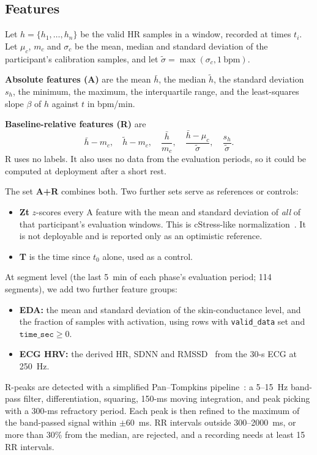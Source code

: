 \documentclass[conference]{IEEEtran}
\begin{document}
\subsection{Features}
Let $h=\{h_1,\dots,h_n\}$ be the valid HR samples in a window, recorded at times $t_i$. Let $\mu_c$, $m_c$ and $\sigma_c$ be the mean, median and standard deviation of the participant's calibration samples, and let $\tilde\sigma=\max(\sigma_c, 1~\mathrm{bpm})$.

\textbf{Absolute features (A)} are the mean $\bar h$, the median $\tilde h$, the standard deviation $s_h$, the minimum, the maximum, the interquartile range, and the least-squares slope $\beta$ of $h$ against $t$ in bpm/min.

\textbf{Baseline-relative features (R)} are
\begin{equation}
\bar h - m_c,\quad \tilde h - m_c,\quad \frac{\bar h}{m_c},\quad \frac{\bar h-\mu_c}{\tilde\sigma},\quad \frac{s_h}{\tilde\sigma}.
\end{equation}
R uses no labels. It also uses no data from the evaluation periods, so it could be computed at deployment after a short rest.

The set \textbf{A+R} combines both. Two further sets serve as references or controls:
\begin{itemize}
\item \textbf{Zt} $z$-scores every A feature with the mean and standard deviation of \emph{all} of that participant's evaluation windows. This is cStress-like normalization~\cite{hovsepian2015cstress}. It is not deployable and is reported only as an optimistic reference.
\item \textbf{T} is the time since $t_0$ alone, used as a control.
\end{itemize}

At segment level (the last 5~min of each phase's evaluation period; 114 segments), we add two further feature groups:
\begin{itemize}
\item \textbf{EDA:} the mean and standard deviation of the skin-conductance level, and the fraction of samples with activation, using rows with \texttt{valid\_data} set and $\texttt{time\_sec}\geq0$.
\item \textbf{ECG HRV:} the derived HR, SDNN and RMSSD~\cite{taskforce1996hrv} from the 30-s ECG at 250~Hz.
\end{itemize}

R-peaks are detected with a simplified Pan--Tompkins pipeline~\cite{pan1985qrs}: a 5--15~Hz band-pass filter, differentiation, squaring, 150-ms moving integration, and peak picking with a 300-ms refractory period. Each peak is then refined to the maximum of the band-passed signal within $\pm$60~ms. RR intervals outside 300--2000~ms, or more than 30\% from the median, are rejected, and a recording needs at least 15 RR intervals.
\end{document}
